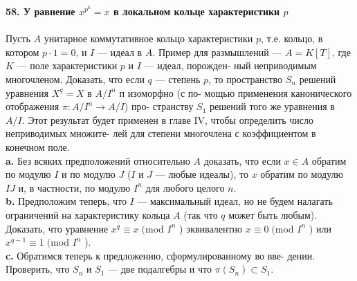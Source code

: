 \noindent\textbf{58. У равнение $x^{p^k}=x$ в локальном кольце характеристики $p$}\\\\
\hspace*{10pt} Пусть $A$ унитарное коммутативное кольцо характеристики $p$, т.е.\linebreak
кольцо, в котором $p\cdot1=0$, и $I$ — идеал в $A$. Пример для размышлений\linebreak
— $A = K[T]$, где $K$ — поле характеристики $p$ и $I$ — идеал, порожден-\linebreak
ный неприводимым многочленом. Доказать, что если $q$ — степень $p$, то\linebreak
пространство $S_n$ решений уравнения $X^q= X$ в $A/I^n$ п изоморфно (с по-\linebreak
мощью применения канонического отображения $\pi:A/I^n\rightarrow A/I$) про-\linebreak
странству $S_1$ решений того же уравнения в $A/I$. Этот результат будет\linebreak
применен в главе IV, чтобы определить число неприводимых множите-\linebreak
лей для степени многочлена с коэффициентом в конечном поле.
\\
\hspace*{10pt}\textbf{a.} Без всяких предположений относительно $A$ доказать, что если\linebreak
$x\in A$ обратим по модулю $I$ и по модулю $J$ ($I$ и $J$ — любые идеалы),\linebreak
то $x$ обратим по модулю $IJ$ и, в частности, по модулю $I^n$ для любого\linebreak
целого $n$.
\\
\hspace*{10pt}\textbf{b.} Предположим теперь, что $I$ — максимальный идеал, но не будем\linebreak
налагать ограничений на характеристику кольца $A$ (так что $q$ может\linebreak
быть любым). Доказать, что уравнение $x^q\equiv x\; ($mod $I^n$ ) эквивалентно\linebreak
$x\equiv0\;($mod $I^n$ ) или $x^{q-1}\equiv1\;($mod $I^n$ ).
\\
\hspace*{10pt}\textbf{c.} Обратимся теперь к предложению, сформулированному во вве-\linebreak
дении. Проверить, что $S_n$ и $S_1$ — две подалгебры и что $\pi(S_n)\subset S_1$.\linebreak
